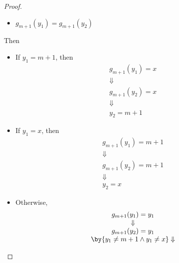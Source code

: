 \begin{proof}
\begin{enumerate}[label=\textbf{(\Alph*)}]
\begin{itemize}
\begin{itemize}
\begin{itemize}
                            \item $g_{m + 1}(y_{1}) = g_{m + 1}(y_{2})$
                          \end{itemize}
                          Then
                          \begin{itemize}
                            \item If $y_{1} = m + 1$, then
                                  \[
                                    \begin{array}{c}
                                      g_{m + 1}(y_{1}) = x \\
                                      \Downarrow           \\
                                      g_{m + 1}(y_{2}) = x \\
                                      \Downarrow           \\
                                      y_{2} = m + 1
                                    \end{array}
                                  \]
                            \item If $y_{1} = x$, then
                                  \[
                                    \begin{array}{c}
                                      g_{m + 1}(y_{1}) = m + 1 \\
                                      \Downarrow               \\
                                      g_{m + 1}(y_{2}) = m + 1 \\
                                      \Downarrow               \\
                                      y_{2} = x
                                    \end{array}
                                  \]
                            \item Otherwise,
                                  \[
                                    \begin{array}{c}
                                      g_{m + 1}(y_{1}) = y_{1}                                         \\
                                      \Downarrow                                                       \\
                                      g_{m + 1}(y_{2}) = y_{1}                                         \\
                                      \by{\ensuremath{y_{1} \neq m + 1 \land y_{1} \neq x}} \Downarrow \\

\end{array}\]
\end{itemize}
\end{itemize}
\end{itemize}
\end{enumerate}
\end{proof}
